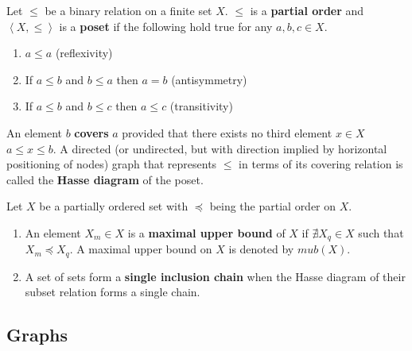 \def\posetr{\le}

\begin{definition}[Poset]
  \label{def:posetdef}    
  Let $\posetr$ be a binary relation on a finite set $X$. $\posetr$ is a \textbf{
    partial order} and $\left< X,\posetr \right>$  is a \textbf{ poset}
  if the following hold true for any $a, b, c \in X$.
 \parindent  {} 
  \begin{enumerate}
  \item $a \posetr a$ (reflexivity)
  \item If $a \posetr b$ and $b \posetr a$ then $a = b$ (antisymmetry)
  \item If $a \posetr b$ and $b \posetr c$ then $a \posetr c$
    (transitivity)
  \end{enumerate}

  An element $b$ \textbf{covers} $a$ provided that there exists no
  third element $x \in X$ \stt $a \posetr x \posetr b$.  A directed
  (or undirected, but with direction implied by horizontal positioning
  of nodes) graph that represents $\posetr$ in terms of its covering
  relation is called the \textbf{Hasse diagram} of the poset.
\end{definition}

\begin{definition}
  \label{def:poset}    
  Let $X$ be a partially ordered set with $\preccurlyeq$ being the
  partial order on $X$.

  \begin{enumerate}
  \hangindent {}
  \item An element $X_m \in X$ is a
    \textbf{maximal upper bound} of $X$ if $\nexists X_q \in X$ such
    that $X_m \preccurlyeq X_q$.  A maximal upper bound on $X$ is
    denoted by $mub(X)$.

  \item A set of sets form a \textbf{single
      inclusion chain} when the Hasse diagram of their subset relation
    forms a single chain.
  \end{enumerate}
\end{definition}

\subsection{Graphs}


